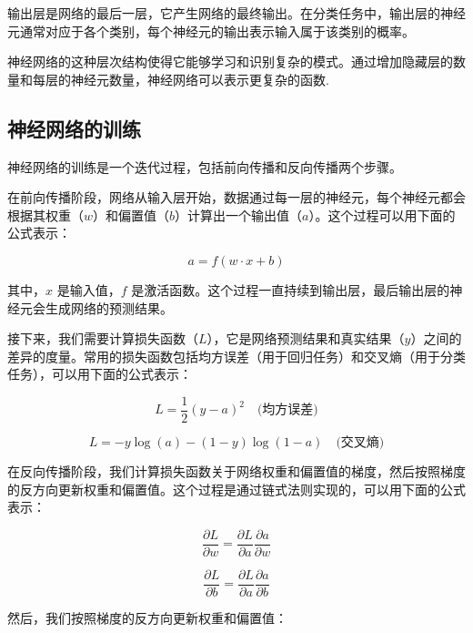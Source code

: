 \documentclass{ctexart}
\begin{document}
    输出层是网络的最后一层，它产生网络的最终输出。在分类任务中，输出层的神经元通常对应于各个类别，每个神经元的输出表示输入属于该类别的概率。

    神经网络的这种层次结构使得它能够学习和识别复杂的模式。通过增加隐藏层的数量和每层的神经元数量，神经网络可以表示更复杂的函数\cite{Haykin2009}.
    \subsection{神经网络的训练}
    神经网络的训练是一个迭代过程，包括前向传播和反向传播两个步骤。

    在前向传播阶段，网络从输入层开始，数据通过每一层的神经元，每个神经元都会根据其权重（$w$）和偏置值（$b$）计算出一个输出值（$a$）。这个过程可以用下面的公式表示：

    \begin{equation}
    a = f(w \cdot x + b)
    \end{equation}

    其中，$x$ 是输入值，$f$ 是激活函数。这个过程一直持续到输出层，最后输出层的神经元会生成网络的预测结果。

    接下来，我们需要计算损失函数（$L$），它是网络预测结果和真实结果（$y$）之间的差异的度量。常用的损失函数包括均方误差（用于回归任务）和交叉熵（用于分类任务），可以用下面的公式表示：

    \begin{equation}
    L = \frac{1}{2}(y - a)^2 \quad \text{(均方误差)}
    \end{equation}

    \begin{equation}
    L = -y \log(a) - (1 - y) \log(1 - a) \quad \text{(交叉熵)}
    \end{equation}

    在反向传播阶段，我们计算损失函数关于网络权重和偏置值的梯度，然后按照梯度的反方向更新权重和偏置值。这个过程是通过链式法则实现的，可以用下面的公式表示：

    \begin{equation}
    \frac{\partial L}{\partial w} = \frac{\partial L}{\partial a} \frac{\partial a}{\partial w}
    \end{equation}

    \begin{equation}
    \frac{\partial L}{\partial b} = \frac{\partial L}{\partial a} \frac{\partial a}{\partial b}
    \end{equation}

    然后，我们按照梯度的反方向更新权重和偏置值：
\end{document}
